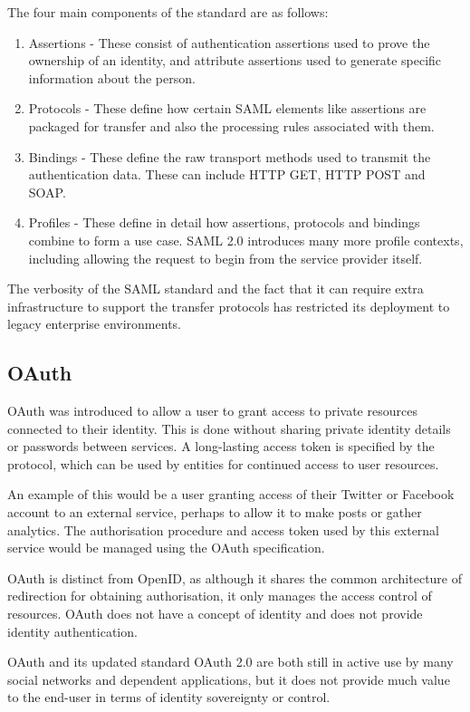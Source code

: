 The four main components of the standard are as follows:
\begin{enumerate}
	\item Assertions - These consist of authentication assertions used to prove the ownership of an identity, and attribute assertions used to generate specific information about the person.
    \item Protocols - These define how certain \ac{SAML} elements like assertions are packaged for transfer and also the processing rules associated with them.
    \item Bindings - These define the raw transport methods used to transmit the authentication data. These can include HTTP GET, HTTP POST and SOAP.
    \item Profiles - These define in detail how assertions, protocols and bindings combine to form a use case. \ac{SAML} 2.0 introduces many more profile contexts, including allowing the request to begin from the service provider itself.
\end{enumerate}

The verbosity of the \ac{SAML} standard and the fact that it can require extra infrastructure to support the transfer protocols \cite{dennis_updated_2015} has restricted its deployment to legacy enterprise environments. 

\subsection{OAuth}
OAuth \cite{hammer-lahav_oauth_2010} was introduced to allow a user to grant access to private resources connected to their identity. This is done without sharing private identity details or passwords between services. A long-lasting access token is specified by the protocol, which can be used by entities for continued access to user resources. 

An example of this would be a user granting access of their Twitter or Facebook account to an external service, perhaps to allow it to make posts or gather analytics. The authorisation procedure and access token used by this external service would be managed using the OAuth specification.

OAuth is distinct from OpenID, as although it shares the common architecture of redirection for obtaining authorisation, it only manages the access control of resources. OAuth does not have a concept of identity and does not provide identity authentication.

OAuth and its updated standard OAuth 2.0 are both still in active use by many social networks and dependent applications, but it does not provide much value to the end-user in terms of identity sovereignty or control.

